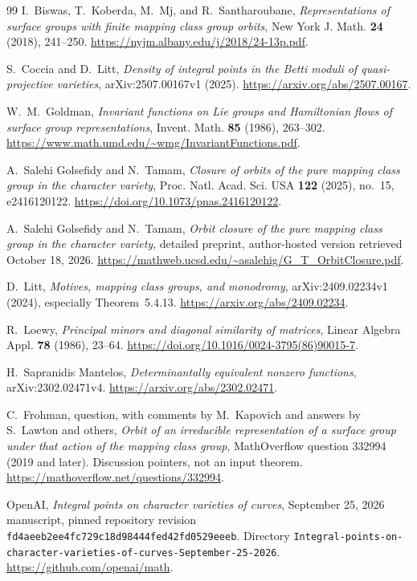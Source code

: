\begin{thebibliography}{99}
I.~Biswas, T.~Koberda, M.~Mj, and R.~Santharoubane,
\emph{Representations of surface groups with finite mapping class group orbits},
New York J. Math. \textbf{24} (2018), 241--250.
\url{https://nyjm.albany.edu/j/2018/24-13p.pdf}.

S.~Coccia and D.~Litt,
\emph{Density of integral points in the Betti moduli of quasi-projective varieties},
arXiv:2507.00167v1 (2025).
\url{https://arxiv.org/abs/2507.00167}.

W.~M.~Goldman,
\emph{Invariant functions on Lie groups and Hamiltonian flows of surface group representations},
Invent. Math. \textbf{85} (1986), 263--302.
\url{https://www.math.umd.edu/~wmg/InvariantFunctions.pdf}.

A.~Salehi Golsefidy and N.~Tamam,
\emph{Closure of orbits of the pure mapping class group in the character variety},
Proc. Natl. Acad. Sci. USA \textbf{122} (2025), no.~15, e2416120122.
\url{https://doi.org/10.1073/pnas.2416120122}.

A.~Salehi Golsefidy and N.~Tamam,
\emph{Orbit closure of the pure mapping class group in the character variety},
detailed preprint, author-hosted version retrieved October 18, 2026.
\url{https://mathweb.ucsd.edu/~asalehig/G_T_OrbitClosure.pdf}.

D.~Litt,
\emph{Motives, mapping class groups, and monodromy},
arXiv:2409.02234v1 (2024), especially Theorem~5.4.13.
\url{https://arxiv.org/abs/2409.02234}.

R.~Loewy,
\emph{Principal minors and diagonal similarity of matrices},
Linear Algebra Appl. \textbf{78} (1986), 23--64.
\url{https://doi.org/10.1016/0024-3795(86)90015-7}.

H.~Sapranidis Mantelos,
\emph{Determinantally equivalent nonzero functions},
arXiv:2302.02471v4.
\url{https://arxiv.org/abs/2302.02471}.

C.~Frohman, question, with comments by M.~Kapovich and answers by
S.~Lawton and others,
\emph{Orbit of an irreducible representation of a surface group under that action
of the mapping class group}, MathOverflow question 332994 (2019 and later).
Discussion pointers, not an input theorem.
\url{https://mathoverflow.net/questions/332994}.

\begingroup\raggedright
{}
OpenAI,
\emph{Integral points on character varieties of curves},
September 25, 2026 manuscript, pinned repository revision
\texttt{fd4aeeb2ee4fc729c18d98444fed42fd0529eeeb}.
Directory \texttt{Integral-points-on-character-varieties-of-curves-September-25-2026}.
\url{https://github.com/openai/math}.\par
\endgroup


\end{thebibliography}
